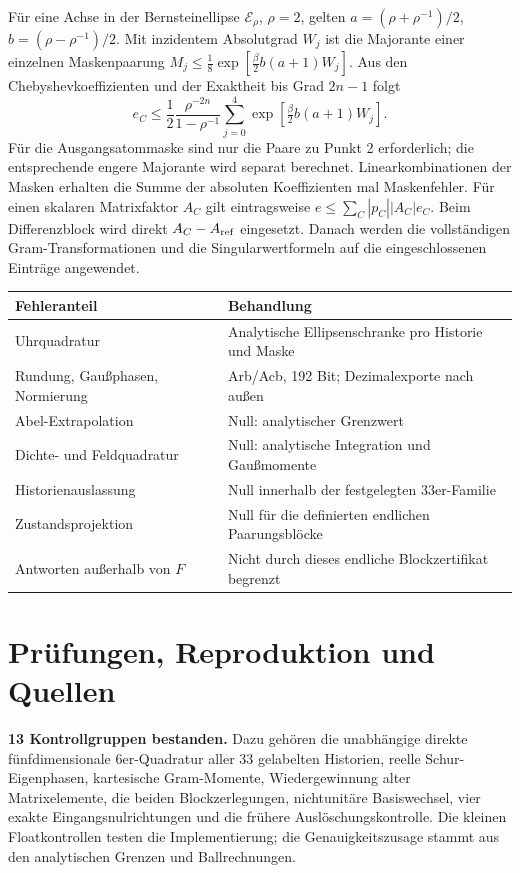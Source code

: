 \documentclass[10pt,a4paper]{article}
\begin{document}
Für eine Achse in der Bernsteinellipse $\mathcal E_\rho$, $\rho=2$,
gelten $a=(\rho+\rho^{-1})/2$, $b=(\rho-\rho^{-1})/2$.
Mit inzidentem Absolutgrad $W_j$ ist die Majorante einer einzelnen
Maskenpaarung $M_j\leq\tfrac18\exp[\tfrac\beta2b(a+1)W_j]$.
Aus den Chebyshevkoeffizienten und der Exaktheit bis Grad $2n-1$ folgt
\[
 e_C\leq\frac12\frac{\rho^{-2n}}{1-\rho^{-1}}
       \sum_{j=0}^4\exp\!\left[\tfrac\beta2b(a+1)W_j\right].
\]
Für die Ausgangsatommaske sind nur die Paare zu Punkt 2 erforderlich;
die entsprechende engere Majorante wird separat berechnet.
Linearkombinationen der Masken erhalten die Summe der absoluten
Koeffizienten mal Maskenfehler. Für einen skalaren Matrixfaktor $A_C$
gilt eintragsweise $e\leq\sum_C|p_C||A_C|e_C$.
Beim Differenzblock wird direkt $A_C-A_{\rm ref}$ eingesetzt.
Danach werden die vollständigen Gram-Transformationen und die
Singularwertformeln auf die eingeschlossenen Einträge angewendet.

\begin{center}\begin{tabular}{p{66mm}p{82mm}}\toprule
Fehleranteil & Behandlung\\\midrule
Uhrquadratur & Analytische Ellipsenschranke pro Historie und Maske\\
Rundung, Gaußphasen, Normierung & Arb/Acb, 192 Bit; Dezimalexporte nach außen\\
Abel-Extrapolation & Null: analytischer Grenzwert\\
Dichte- und Feldquadratur & Null: analytische Integration und Gaußmomente\\
Historienauslassung & Null innerhalb der festgelegten 33er-Familie\\
Zustandsprojektion & Null für die definierten endlichen Paarungsblöcke\\
Antworten außerhalb von $F$ & Nicht durch dieses endliche Blockzertifikat begrenzt\\\bottomrule
\end{tabular}\end{center}

\section{Prüfungen, Reproduktion und Quellen}
\textbf{13 Kontrollgruppen bestanden.} Dazu gehören die unabhängige direkte
fünfdimensionale 6er-Quadratur aller 33 gelabelten Historien, reelle
Schur-Eigenphasen, kartesische Gram-Momente, Wiedergewinnung alter
Matrixelemente, die beiden Blockzerlegungen, nichtunitäre Basiswechsel,
vier exakte Eingangsnulrichtungen und die frühere Auslöschungskontrolle.
Die kleinen Floatkontrollen testen die Implementierung; die
Genauigkeitszusage stammt aus den analytischen Grenzen und Ballrechnungen.
\end{document}
